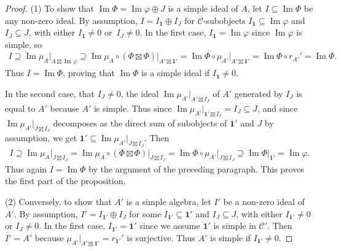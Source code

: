 \documentclass[pdftex]{sigma}
\numberwithin{equation}{section}
\theoremstyle{definition}
\begin{document}
\begin{proof}
(1) To show that $\operatorname{Im} \Phi=\operatorname{Im} \varphi\oplus J$ is a simple ideal of $A$, let $I\subseteq\operatorname{Im} \Phi$ be any non-zero ideal. By assumption, $I=I_\mathbf{1}\oplus I_J$ for $\mathcal{C}$-subobjects $I_\mathbf{1}\subseteq\operatorname{Im} \varphi$ and $I_J\subseteq J$, with either $I_\mathbf{1}\neq 0$ or~${I_J\neq 0}$. In the first case, $I_\mathbf{1}=\operatorname{Im} \varphi$ since $\operatorname{Im} \varphi$ is simple, so
\begin{gather*}
I\supseteq \operatorname{Im} \mu_A\vert_{A\boxtimes\operatorname{Im} \varphi}\supseteq\operatorname{Im} \mu_A\circ(\Phi\boxtimes\Phi)\vert_{A'\boxtimes\mathbf{1}'} =\operatorname{Im} \Phi\circ\mu_{A'}\vert_{A'\boxtimes\mathbf{1}'} =\operatorname{Im} \Phi\circ r_{A'}' =\operatorname{Im} \Phi.
\end{gather*}
Thus $I=\operatorname{Im} \Phi$, proving that $\operatorname{Im} \Phi$ is a simple ideal if $I_\mathbf{1}\neq 0$.

In the second case, that $I_J\neq 0$, the ideal $\operatorname{Im} \mu_{A'}\vert_{A'\boxtimes I_J}$ of $A'$ generated by $I_J$ is equal to $A'$ because $A'$ is simple. Thus since $\operatorname{Im} \mu_{A'}\vert_{\mathbf{1}'\boxtimes I_J}=I_J\subseteq J$, and since $\operatorname{Im} \mu_{A'}\vert_{J\boxtimes I_J}$ decomposes as the direct sum of subobjects of $\mathbf{1}'$ and $J$ by assumption, we get $\mathbf{1}'\subseteq\operatorname{Im} \mu_{A'}\vert_{J\boxtimes I_J}$. Then
\begin{gather*}
I\supseteq\operatorname{Im} \mu_A\vert_{J\boxtimes I_J} =\operatorname{Im} \mu_A\circ(\Phi\boxtimes\Phi)\vert_{J\boxtimes I_J}=\operatorname{Im} \Phi\circ\mu_{A'}\vert_{J\boxtimes I_J}\supseteq\operatorname{Im} \Phi\vert_{\mathbf{1}'} =\operatorname{Im} \varphi.
\end{gather*}
Thus again $I=\operatorname{Im} \Phi$ by the argument of the preceding paragraph. This proves the first part of the proposition.

(2) Conversely, to show that $A'$ is a simple algebra, let $I'$ be a non-zero ideal of $A'$. By assumption, $I'=I_{\mathbf{1}'}\oplus I_J$ for some $I_{\mathbf{1}'}\subseteq\mathbf{1}'$ and $I_J\subseteq J$, with either $I_{\mathbf{1}'}\neq 0$ or $I_J\neq 0$. In the first case, $I_{\mathbf{1}'}=\mathbf{1}'$ since we assume $\mathbf{1}'$ is simple in $\mathcal{C}'$. Then $I'=A'$ because $\mu_{A'}\vert_{A'\boxtimes\mathbf{1}'}=r_{\mathbf{1}'}'$ is surjective. Thus $A'$ is simple if $I_{\mathbf{1}'}\neq 0$.


\end{proof}
\end{document}
